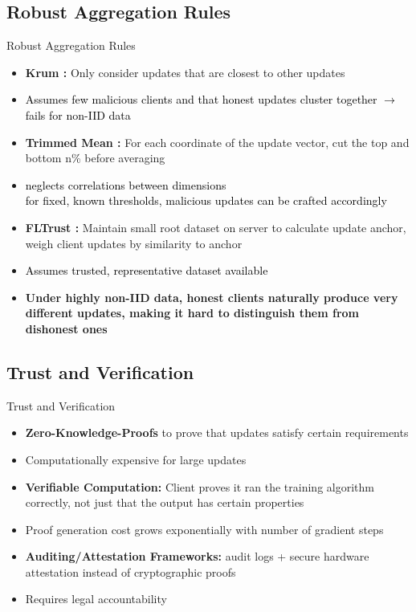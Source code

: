 \documentclass[t,aspectratio=169]{beamer}
\begin{document}
\subsection{Robust Aggregation Rules}
\begin{frame}{Robust Aggregation Rules}
    \begin{itemize}
        \item \textbf{Krum \cite{Krum}:} Only consider updates that are closest to other updates
        \item[\textcolor{red}{!}] \textcolor{black}{Assumes few malicious clients and that honest updates cluster together $\rightarrow$ fails for non-IID data}
        \item \textbf{Trimmed Mean \cite{TrimmedMean}:} For each coordinate of the update vector, cut the top and bottom n\% before averaging
        \item[\textcolor{red}{!}] \textcolor{black}{neglects correlations between dimensions \\ for fixed, known thresholds, malicious updates can be crafted accordingly}
        \item \textbf{FLTrust \cite{cao2021fltrust}:} Maintain small root dataset on server to calculate update anchor, weigh client updates by similarity to anchor
        \item[\textcolor{red}{!}] \textcolor{black}{Assumes trusted, representative dataset available}
        \pause
        \item[] \textbf{Under highly non-IID data, honest clients naturally produce very different updates, making it hard to distinguish them from dishonest ones}
    \end{itemize}
\end{frame}

\subsection{Trust and Verification}
\begin{frame}{Trust and Verification}
    \vfill
    \begin{itemize}
        \item \textbf{Zero-Knowledge-Proofs} to prove that updates satisfy certain requirements \cite{burkhalter2023rofl}
        \item[\textcolor{red}{!}] Computationally expensive for large updates
        \item \textbf{Verifiable Computation:}  Client proves it ran the training algorithm correctly, not just that the output has certain properties
        \item[\textcolor{red}{!}] Proof generation cost grows exponentially with number of gradient steps
        \item \textbf{Auditing/Attestation Frameworks:} audit logs + secure hardware attestation instead of cryptographic proofs
        \item[\textcolor{red}{!}] Requires legal accountability
    \end{itemize}
\end{frame}
\end{document}
